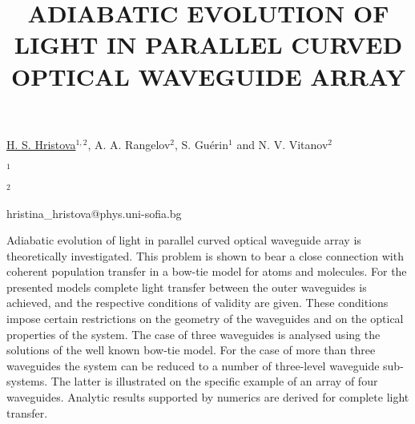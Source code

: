 \title{ADIABATIC EVOLUTION OF LIGHT IN PARALLEL CURVED OPTICAL WAVEGUIDE ARRAY}

\underline{H. S. Hristova}$^{1,2}$, A. A. Rangelov$^{2}$, S. Gu\'erin$^{1}$ and N. V. Vitanov$^{2}$
   

{\normalsize{

\vspace{-4mm} $^{1}$\dijon

\vspace{-4mm} $^{2}$\unisofia

\email hristina\_hristova@phys.uni-sofia.bg}}

Adiabatic evolution of light in parallel curved optical waveguide array is theoretically investigated.
This problem is shown to bear a close connection with coherent population transfer in a bow-tie
model for atoms and molecules. For the presented models complete light transfer between the outer
waveguides is achieved, and the respective conditions of validity are given. These conditions impose
certain restrictions on the geometry of the waveguides and on the optical properties of the system.
The case of three waveguides is analysed using the solutions of the well known bow-tie model. For the
case of more than three waveguides the system can be reduced to a number of three-level waveguide sub-systems.
The latter is illustrated on the specific example of an array of four waveguides. Analytic
results supported by numerics are derived for complete light transfer.

\vspace{\baselineskip} 